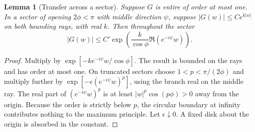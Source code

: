\documentclass[11pt,letterpaper]{article}
\newtheorem{lemma}[theorem]{Lemma}
\begin{document}
\begin{lemma}[Transfer across a sector]\label{lem:sector}
Suppose $G$ is entire of order at most one. In a sector of opening $2\phi<\pi$ with middle direction $\psi$, suppose $|G(w)|\le C e^{k|w|}$ on both bounding rays, with real $k$. Then throughout the sector
\begin{equation}
 |G(w)|\le C'\exp\left(\frac{k}{\cos\phi}\Re(e^{-i\psi}w)\right).
 \label{eq:sector}
\end{equation}
\end{lemma}
\begin{proof}
Multiply by $\exp[-k e^{-i\psi}w/\cos\phi]$. The result is bounded on the rays and has order at most one. On truncated sectors choose $1<p<\pi/(2\phi)$ and multiply further by $\exp[-\epsilon(e^{-i\psi}w)^p]$, using the branch real on the middle ray. The real part of $(e^{-i\psi}w)^p$ is at least $|w|^p\cos(p\phi)>0$ away from the origin. Because the order is strictly below $p$, the circular boundary at infinity contributes nothing to the maximum principle. Let $\epsilon\downarrow0$. A fixed disk about the origin is absorbed in the constant.
\end{proof}
\end{document}
